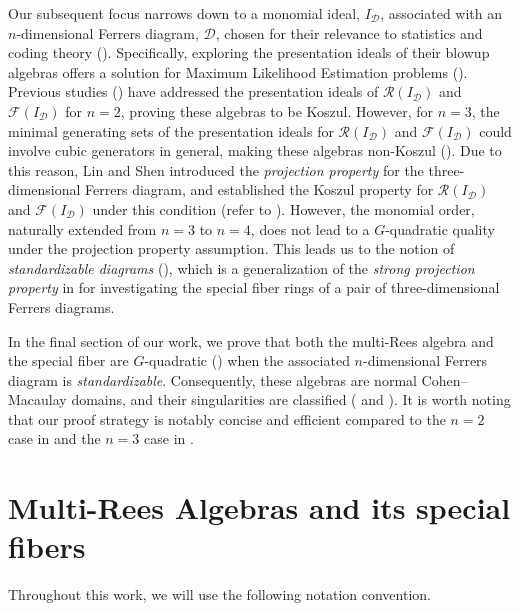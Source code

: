 \documentclass[11pt,a4paper,reqno,dvipsnames]{amsart}
\theoremstyle{plain}
\theoremstyle{definition}
\newtheorem{Assumptions and Discussion}[Theorem]{Assumptions and Discussion}
\theoremstyle{remark}
\newcommand\calD{\mathcal{D}}
\newcommand\calF{\mathcal{F}}
\newcommand\calR{\mathcal{R}}
\begin{document}
Our subsequent focus narrows down to a monomial ideal, $I_{\calD}$, associated with an $n$-dimensional Ferrers diagram, $\calD$, chosen for their relevance to statistics and coding theory (\cites{CNPY, GR}). Specifically, exploring the presentation ideals of their blowup algebras offers a solution for Maximum Likelihood Estimation problems (\cite{HKS}). Previous  studies (\cite{CN,CNPY}) have addressed the presentation ideals of $\calR(I_{\calD})$ and $\calF(I_{\calD})$ for $n=2$, 
proving these algebras to be Koszul. However, for $n=3$, the minimal generating sets of the presentation ideals for $\calR(I_{\calD})$ and $\calF(I_{\calD})$ could involve cubic generators in general, making these algebras non-Koszul (\cite[Example 2.4]{Lin-Shen3D}).  Due to this reason, Lin and Shen introduced the \emph{projection property} for the three-dimensional Ferrers diagram, and established the Koszul property for $\calR(I_{\calD})$ and $\calF(I_{\calD})$ under this condition (refer to ).
However, the monomial order, naturally extended from $n = 3$ to $n = 4$, does not lead to a $G$-quadratic quality under the projection property assumption. 
This leads us to the notion of \emph{standardizable diagrams} (), which is a generalization of the \emph{strong projection property} in \cite{Lin-Shen3DMulti} for investigating the special fiber rings of a pair of three-dimensional Ferrers diagrams. 

In the final section of our work, we prove that both the multi-Rees algebra and the special fiber are $G$-quadratic () when the associated $n$-dimensional Ferrers diagram is \emph{standardizable}. Consequently, these algebras are normal Cohen--Macaulay domains, and their singularities are classified ( and ). It is worth noting that our proof strategy is notably concise and efficient compared to the $n=2$ case in \cite{CNPY} and the $n=3$ case in \cite{Lin-Shen3D}. 


\section{Multi-Rees Algebras and its special fibers}

Throughout this work, we will use the following notation convention.
\end{document}
